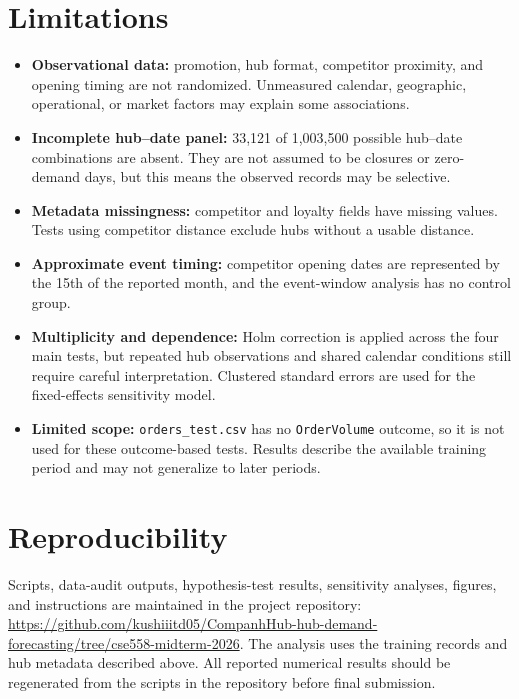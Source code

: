 \documentclass[10pt,a4paper,twocolumn]{article}
\begin{document}
\section{Limitations}
\begin{itemize}
\item \textbf{Observational data:} promotion, hub format, competitor proximity, and opening timing are not randomized. Unmeasured calendar, geographic, operational, or market factors may explain some associations.
\item \textbf{Incomplete hub--date panel:} 33,121 of 1,003,500 possible hub--date combinations are absent. They are not assumed to be closures or zero-demand days, but this means the observed records may be selective.
\item \textbf{Metadata missingness:} competitor and loyalty fields have missing values. Tests using competitor distance exclude hubs without a usable distance.
\item \textbf{Approximate event timing:} competitor opening dates are represented by the 15th of the reported month, and the event-window analysis has no control group.
\item \textbf{Multiplicity and dependence:} Holm correction is applied across the four main tests, but repeated hub observations and shared calendar conditions still require careful interpretation. Clustered standard errors are used for the fixed-effects sensitivity model.
\item \textbf{Limited scope:} \texttt{orders\_test.csv} has no \texttt{OrderVolume} outcome, so it is not used for these outcome-based tests. Results describe the available training period and may not generalize to later periods.
\end{itemize}

\section*{Reproducibility}
Scripts, data-audit outputs, hypothesis-test results, sensitivity analyses, figures, and instructions are maintained in the project repository:
\url{https://github.com/kushiiitd05/CompanhHub-hub-demand-forecasting/tree/cse558-midterm-2026}.
The analysis uses the training records and hub metadata described above. All reported numerical results should be regenerated from the scripts in the repository before final submission.
\end{document}
